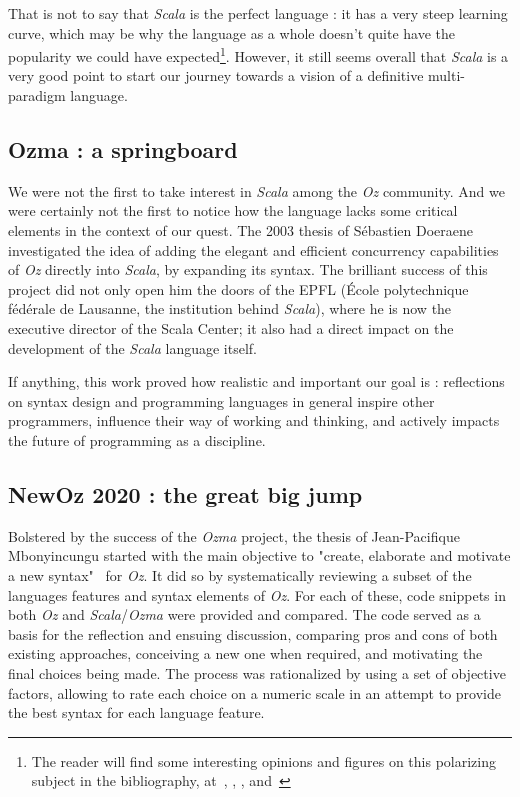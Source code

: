 That is not to say that \textit{Scala} is the perfect language :
it has a very steep learning curve, which may be why the language as a whole doesn't quite have the popularity we could have expected\footnote{The reader will find some interesting opinions and figures on this polarizing subject in the bibliography, at~\cite{scalaOpinion1}, \cite{scalaOpinion2}, \cite{jetbrainsfigures}, and~\cite{tiobeindex}}.
However, it still seems overall that \textit{Scala} is a very good point to start our journey towards a vision of a definitive multi-paradigm language.

\subsection{Ozma : a springboard}\label{subsec:ch1-ozma}
We were not the first to take interest in \textit{Scala} among the \textit{Oz} community.
And we were certainly not the first to notice how the language lacks some critical elements in the context of our quest.\newline
The 2003 thesis of Sébastien Doeraene~\cite{Ozma} investigated the idea of adding the elegant and efficient concurrency capabilities of \textit{Oz} directly into \textit{Scala}, by expanding its syntax.
The brilliant success of this project did not only open him the doors of the EPFL (École polytechnique fédérale de Lausanne, the institution behind \textit{Scala}), where he is now the executive director of the Scala Center;
it also had a direct impact on the development of the \textit{Scala} language itself.\newline

If anything, this work proved how realistic and important our goal is : reflections on syntax design and programming languages in general inspire other programmers, influence their way of working and thinking, and actively impacts the future of programming as a discipline.

\subsection{NewOz 2020 : the great big jump}\label{subsec:ch1-newoz2020}
Bolstered by the success of the \textit{Ozma} project, the thesis of Jean-Pacifique Mbonyincungu started with the main objective to "create, elaborate and motivate a new syntax"~\cite{jpthesis} for \textit{Oz}.
It did so by systematically reviewing a subset of the languages features and syntax elements of \textit{Oz}.
For each of these, code snippets in both \textit{Oz} and \textit{Scala}/\textit{Ozma} were provided and compared.
The code served as a basis for the reflection and ensuing discussion, comparing pros and cons of both existing approaches, conceiving a new one when required, and motivating the final choices being made.
The process was rationalized by using a set of objective factors, allowing to rate each choice on a numeric scale in an attempt to provide the best syntax for each language feature.\newline

